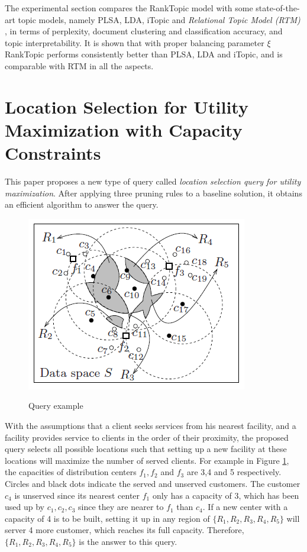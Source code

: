 \documentclass[paper=a4, fontsize=18pt]{article} %
\numberwithin{equation}{section} %
\numberwithin{figure}{section} %
\numberwithin{table}{section} %
\begin{document}
The experimental section compares the RankTopic model with some state-of-the-art topic models, namely PLSA, LDA, iTopic and \emph{Relational Topic Model (RTM)} \cite{CB13}, in terms of perplexity, document clustering and classification accuracy, and topic interpretability. It is shown that with proper balancing parameter $\xi$ RankTopic performs consistently better than PLSA, LDA and iTopic, and is comparable with RTM in all the aspects.


\section{Location Selection for Utility Maximization with Capacity
Constraints \cite{SHCZD12}}

This paper proposes a new type of query called \emph{location selection query for utility maximization}. After applying three pruning rules to a baseline solution, it obtains an efficient algorithm to answer the query.

\begin{figure}[h]
  \centering
  \includegraphics[width=.4\linewidth]{9_12_CIKM1.png}\\
  \caption{Query example}\label{fig:CIKM1}
\end{figure}

With the assumptions that a client seeks services from his nearest facility, and a facility provides service to clients in the order of their proximity, the proposed query selects all possible locations such that setting up a new facility at these locations will maximize the number of served clients. For example in Figure \ref{fig:CIKM1}, the capacities of distribution centers $f_1, f_2$ and $f_3$ are 3,4 and 5 respectively. Circles and black dots indicate the served and unserved customers. The customer $c_4$ is unserved since its nearest center $f_1$ only has a capacity of 3, which has been used up by $c_1, c_2, c_3$ since they are nearer to $f_1$ than $c_4$. If a new center with a capacity of 4 is to be built, setting it up in any region of $\{R_1, R_2, R_3, R_4, R_5\}$ will server 4 more customer, which reaches its full capacity. Therefore, $\{R_1, R_2, R_3, R_4, R_5\}$ is the answer to this query.
\end{document}

